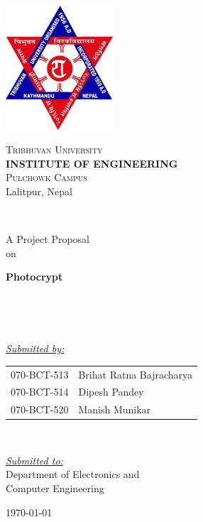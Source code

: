 \begin{titlepage}
    \centering
    \includegraphics[width=0.3\textwidth]{images/tu-logo.png}

    \LARGE
    \textsc{Tribhuvan University} \\[5pt]
    \Large
    \textbf{INSTITUTE OF ENGINEERING}\\
    \Large
    \textsc{Pulchowk Campus} \\
    \large
    Lalitpur, Nepal

    ~

    {\Large A Project Proposal\\on}

    {\Huge \bf Photocrypt}

    ~ 

    ~

    \textit{\uline{Submitted by:}} \\
    \begin{tabular}{r|l}
        {\small 070-BCT-513} & Brihat Ratna Bajracharya\\
        {\small 070-BCT-514} & Dipesh Pandey\\
        {\small 070-BCT-520} & Manish Munikar\\
    \end{tabular}

    ~

    \textit{\uline{Submitted to:}} \\
    Department of Electronics and\\Computer Engineering

    \vfill
    \today
\end{titlepage}
